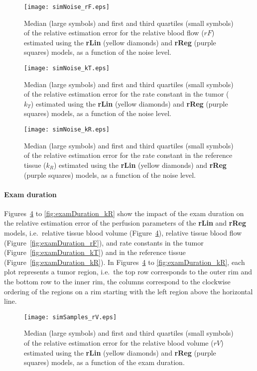 \begin{figure}
\texttt{[image: simNoise\_rF.eps]}
\caption{Median (large symbols) and first and third quartiles (small symbols) of the relative estimation error for the relative blood flow ($rF$) estimated using the \textbf{rLin} (yellow diamonds) and \textbf{rReg} (purple squares) models, as a function of the noise level.}
\label{fig:noise_rF}
\end{figure}

\begin{figure}
\texttt{[image: simNoise\_kT.eps]}
\caption{Median (large symbols) and first and third quartiles (small symbols) of the relative estimation error for the rate constant in the tumor ($k_T$) estimated using the \textbf{rLin} (yellow diamonds) and \textbf{rReg} (purple squares) models, as a function of the noise level.}
\label{fig:noise_kT}
\end{figure}

\begin{figure}
\texttt{[image: simNoise\_kR.eps]}
\caption{Median (large symbols) and first and third quartiles (small symbols) of the relative estimation error for the rate constant in the reference tissue ($k_R$) estimated using the \textbf{rLin} (yellow diamonds) and \textbf{rReg} (purple squares) models, as a function of the noise level.}
\label{fig:noise_kR}
\end{figure}

\paragraph{Exam duration}
Figures~\ref{fig:examDuration_rV} to \ref{fig:examDuration_kR} show the impact of the exam duration on the relative estimation error of the perfusion parameters of the \textbf{rLin} and \textbf{rReg} models, i.e.~relative tissue blood volume (Figure~\ref{fig:examDuration_rV}), relative tissue blood flow (Figure~\ref{fig:examDuration_rF}), and rate constants in the tumor (Figure~\ref{fig:examDuration_kT}) and in the reference tissue (Figure~\ref{fig:examDuration_kR}).
In Figures~\ref{fig:examDuration_rV} to \ref{fig:examDuration_kR}, each plot represents a tumor region, i.e.~the top row corresponds to the outer rim and the bottom row to the inner rim, the columns correspond to the clockwise ordering of the regions on a rim starting with the left region above the horizontal line.

\begin{figure}
\texttt{[image: simSamples\_rV.eps]}
\caption{Median (large symbols) and first and third quartiles (small symbols) of the relative estimation error for the relative blood volume ($rV$) estimated using the \textbf{rLin} (yellow diamonds) and \textbf{rReg} (purple squares) models, as a function of the exam duration.}
\label{fig:examDuration_rV}
\end{figure}

